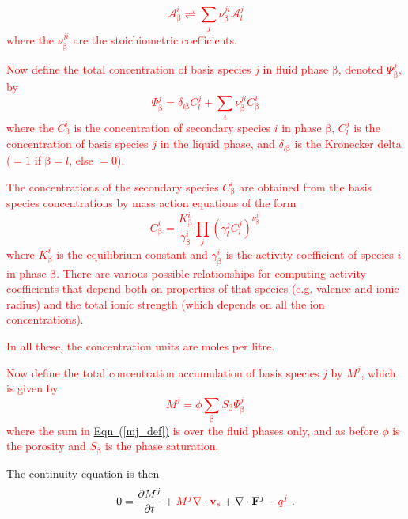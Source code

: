\documentclass[12pt]{report}
\def\phase{\mathrm{\beta}}
\def\flux{\mathbf{F}}
\begin{document}
\textcolor{red}{
\begin{equation}
  \mathcal{A}_{\phase}^{i} \rightleftharpoons \sum_{j} \nu_{\phase}^{ji} \mathcal{A}_{l}^{j}
\end{equation}
where the $\nu_{\phase}^{ji}$ are the stoichiometric coefficients.
}

\textcolor{red}{
Now define the total concentration of basis species $j$ in fluid phase
$\phase$, denoted $\Psi_{\phase}^{j}$, by
\begin{equation}
  \Psi_{\phase}^{j}=\delta_{l \phase} C_{l}^{j}+ \sum_{i}
  \nu_{\phase}^{ji} C_{\phase}^{i}
\end{equation}
where the $C_{\phase}^{i}$ is the concentration of secondary species
$i$ in phase $\phase$,  $C_{l}^{j}$ is the concentration of basis
species $j$ in the liquid phase, and $\delta_{l \phase}$ is the
Kronecker delta ($=1$ if $\phase = l$, else $=0$).
}

\textcolor{red}{
The concentrations of the secondary species $C_{\phase}^{i}$ are
obtained from the basis species concentrations by mass action
equations of the form
\begin{equation}
  C_{\phase}^{i} = \frac{K_{\phase}^{i}}{\gamma_{\phase}^{i}}
  \prod_{j} (\gamma_{l}^{j} C_{l}^{j})^{\nu_{\phase}^{j i}}
\end{equation}
where $K_{\phase}^{i}$ is the equilibrium constant and
$\gamma_{\phase}^{i}$ is the activity coefficient of species $i$ in
phase $\phase$. There are various possible relationships for computing
activity coefficients that depend both on properties of that species
(e.g. valence and ionic radius) and the total ionic strength (which
depends on all the ion concentrations).
}

\textcolor{red}{
In all these, the concentration units are moles per litre.
}

\textcolor{red}{
Now define the total concentration accumulation of basis species $j$
by $M^{j}$, which is given by
\begin{equation}
  \label{mj_def}
  M^{j}=\phi \sum_{\phase} S_{\phase} \Psi^{j}_{\phase}
\end{equation}
where the sum in \hyperref[mj_def]{Eqn~(\ref*{mj_def})} is over the
fluid phases only, and as before $\phi$ is the porosity and
$S_{\phase}$ is the phase saturation.  }

The continuity equation is then
\begin{equation}
0 = \frac{\partial M^{j}}{\partial t} + \textcolor{red}{M^{j}\nabla\cdot{\mathbf
  v}_{s}} + \nabla\cdot \flux^{j} - \textcolor{red}{q^{j}} \ .
\label{chemistry_continuity}
\end{equation}
\end{document}
